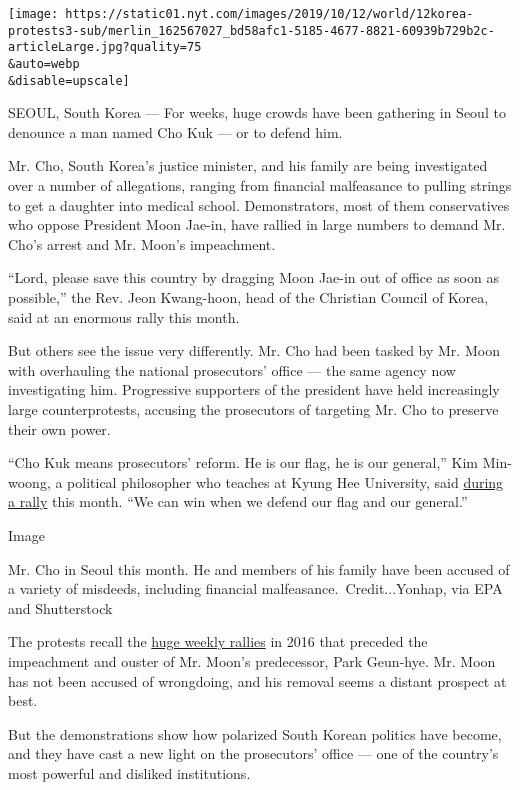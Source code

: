 \texttt{[image: https://static01.nyt.com/images/2019/10/12/world/12korea-protests3-sub/merlin\_162567027\_bd58afc1-5185-4677-8821-60939b729b2c-articleLarge.jpg?quality=75\\\&auto=webp\\\&disable=upscale]}

SEOUL, South Korea --- For weeks, huge crowds have been gathering in
Seoul to denounce a man named Cho Kuk --- or to defend him.

Mr. Cho, South Korea's justice minister, and his family are being
investigated over a number of allegations, ranging from financial
malfeasance to pulling strings to get a daughter into medical school.
Demonstrators, most of them conservatives who oppose President Moon
Jae-in, have rallied in large numbers to demand Mr. Cho's arrest and Mr.
Moon's impeachment.

``Lord, please save this country by dragging Moon Jae-in out of office
as soon as possible,'' the Rev. Jeon Kwang-hoon, ​head of the Christian
Council of Korea​, said at an enormous rally this month.

But others see the issue very differently. Mr. Cho had been tasked by
Mr. Moon with overhauling the national prosecutors' office --- the same
agency now investigating him. Progressive supporters of the president
have held increasingly large counterprotests, accusing the prosecutors
of targeting Mr. Cho to preserve their own power.

``Cho Kuk means prosecutors' reform. He is our flag, he is our
general,'' Kim Min-woong, a political philosopher who teaches at Kyung
Hee University, said
\href{https://www.youtube.com/watch?v=d-bbuTfZuo4\&t=362s}{during a
rally} this month. ``We can win when we defend our flag and our
general.''

Image

Mr. Cho in Seoul this month. He and members of his family have been
accused of a variety of misdeeds, including financial
malfeasance.~Credit...Yonhap, via EPA and Shutterstock

The protests recall the
\href{https://www.nytimes.com/2016/11/13/world/asia/korea-park-geun-hye-protests.html}{huge
weekly rallies} in 2016 that preceded the impeachment and ouster of Mr.
Moon's predecessor, Park Geun-hye. Mr. Moon has not been accused of
wrongdoing, and his removal seems a distant prospect at best.

But the demonstrations show how polarized South Korean politics have
become, and they have cast a new light on the prosecutors' office ---
one of the country's most powerful and disliked institutions.

